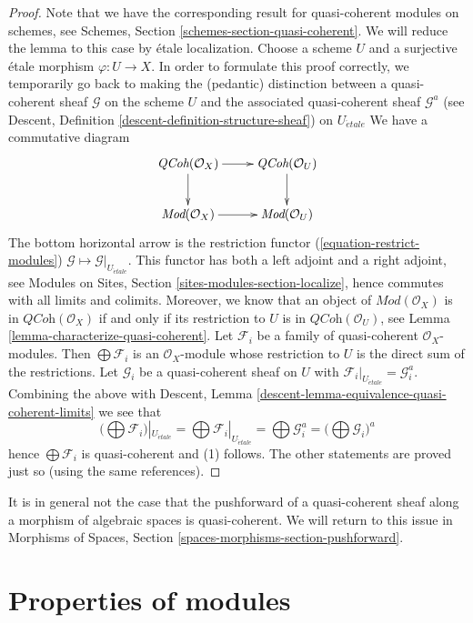 \begin{proof}
Note that we have the corresponding result for quasi-coherent modules
on schemes, see
Schemes, Section \ref{schemes-section-quasi-coherent}.
We will reduce the lemma to this case by \'etale localization.
Choose a scheme $U$ and a surjective \'etale morphism $\varphi : U \to X$.
In order to formulate this proof correctly, we temporarily go back
to making the (pedantic) distinction between a quasi-coherent sheaf
$\mathcal{G}$ on the scheme $U$ and the associated quasi-coherent sheaf
$\mathcal{G}^a$ (see
Descent, Definition \ref{descent-definition-structure-sheaf})
on $U_{\acute{e}tale}$
We have a commutative diagram
$$
\xymatrix{
\textit{QCoh}(\mathcal{O}_X) \ar[r] \ar[d] &
\textit{QCoh}(\mathcal{O}_U) \ar[d] \\
\textit{Mod}(\mathcal{O}_X) \ar[r] &
\textit{Mod}(\mathcal{O}_U)
}
$$
The bottom horizontal arrow is the restriction functor
(\ref{equation-restrict-modules})
$\mathcal{G} \mapsto \mathcal{G}|_{U_{\acute{e}tale}}$.
This functor has both a left adjoint and a right adjoint, see
Modules on Sites, Section \ref{sites-modules-section-localize},
hence commutes with all limits and colimits.
Moreover, we know that an object of $\textit{Mod}(\mathcal{O}_X)$ is in
$\textit{QCoh}(\mathcal{O}_X)$ if and only if its restriction to $U$ is in
$\textit{QCoh}(\mathcal{O}_U)$, see
Lemma \ref{lemma-characterize-quasi-coherent}.
Let $\mathcal{F}_i$ be a family of
quasi-coherent $\mathcal{O}_X$-modules. Then $\bigoplus \mathcal{F}_i$
is an $\mathcal{O}_X$-module whose restriction to $U$ is the direct sum
of the restrictions. Let $\mathcal{G}_i$ be a quasi-coherent sheaf
on $U$ with $\mathcal{F}_i|_{U_{\acute{e}tale}} = \mathcal{G}_i^a$.
Combining the above with
Descent, Lemma \ref{descent-lemma-equivalence-quasi-coherent-limits}
we see that
$$
\Big(\bigoplus \mathcal{F}_i\Big)|_{U_{\acute{e}tale}} =
\bigoplus \mathcal{F}_i|_{U_{\acute{e}tale}} =
\bigoplus \mathcal{G}_i^a =
\Big(\bigoplus \mathcal{G}_i\Big)^a
$$
hence $\bigoplus \mathcal{F}_i$ is quasi-coherent and (1) follows.
The other statements are proved just so (using the same references).
\end{proof}

\noindent
It is in general not the case that the pushforward of a quasi-coherent sheaf
along a morphism of algebraic spaces is quasi-coherent. We will return to this
issue in
Morphisms of Spaces, Section \ref{spaces-morphisms-section-pushforward}.




\section{Properties of modules}
\label{section-properties-modules}

